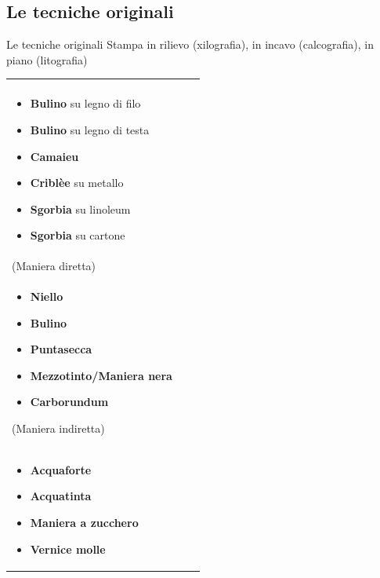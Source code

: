 \documentclass[hidelinks,aspectratio=169]{beamer}
\begin{document}
	\subsection{Le tecniche originali}
	\begin{frame}{Le tecniche originali}
		Stampa in rilievo (xilografia), in incavo (calcografia), in piano (litografia)
		\begin{tabularx}{\textwidth}{XXX}
			{
			\begin{center}
				\large{Xilografia}\\
				\bigskip
				\begin{itemize}
					\item \small{\textbf{Bulino} su legno di filo}
					\item \small{\textbf{Bulino} su legno di testa}
					\item \small{\textbf{Camaieu}}
					\item \small{\textbf{Criblèe} su metallo}
					\item \small{\textbf{Sgorbia} su linoleum}
					\item \small{\textbf{Sgorbia} su cartone}
				\end{itemize}
			\end{center}
			}&{
			\begin{center}
				\large{Calcografia}\\
				\normalsize
				\bigskip
				\normalsize{(Maniera diretta)}\\
				\begin{itemize}
					\item \scriptsize{\textbf{Niello}}
					\item \scriptsize{\textbf{Bulino}}
					\item \scriptsize{\textbf{Puntasecca}}
					\item \scriptsize{\textbf{Mezzotinto/Maniera nera}}
					\item \scriptsize{\textbf{Carborundum}}
				\end{itemize}
				\medskip
				\normalsize{(Maniera indiretta)}\\
				\begin{itemize}
					\item \scriptsize{\textbf{Acquaforte}}
					\item \scriptsize{\textbf{Acquatinta}}
					\item \scriptsize{\textbf{Maniera a zucchero}}
					\item \scriptsize{\textbf{Vernice molle}}
				\end{itemize}

\end{center}}
\end{tabularx}
\end{frame}
\end{document}

